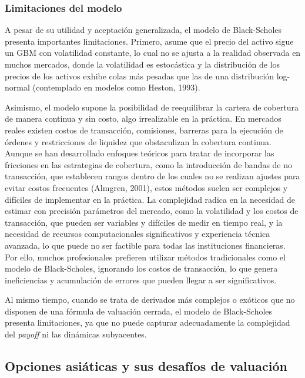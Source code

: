 \documentclass[11pt,a4paper,spanish]{article}
\numberwithin{equation}{section} %
\begin{document}
\subsubsection{Limitaciones del modelo}

A pesar de su utilidad y aceptación generalizada, el modelo de Black-Scholes presenta importantes limitaciones. Primero, asume que el precio del activo sigue un GBM con volatilidad constante, lo cual no se ajusta a la realidad observada en muchos mercados, donde la volatilidad es estocástica y la distribución de los precios de los activos exhibe colas más pesadas que las de una distribución log-normal (contemplado en modelos como Heston, 1993).

Asimismo, el modelo supone la posibilidad de reequilibrar la cartera de cobertura de manera continua y sin costo, algo irrealizable en la práctica. En mercados reales existen costos de transacción, comisiones, barreras para la ejecución de órdenes y restricciones de liquidez que obstaculizan la cobertura continua. Aunque se han desarrollado enfoques teóricos para tratar de incorporar las fricciones en las estrategias de cobertura, como la introducción de bandas de no transacción, que establecen rangos dentro de los cuales no se realizan ajustes para evitar costos frecuentes (Almgren, 2001), estos métodos suelen ser complejos y difíciles de implementar en la práctica. La complejidad radica en la necesidad de estimar con precisión parámetros del mercado, como la volatilidad y los costos de transacción, que pueden ser variables y difíciles de medir en tiempo real, y la necesidad de recursos computacionales significativos y experiencia técnica avanzada, lo que puede no ser factible para todas las instituciones financieras. Por ello, muchos profesionales prefieren utilizar métodos tradicionales como el modelo de Black-Scholes, ignorando los costos de transacción, lo que genera ineficiencias y acumulación de errores que pueden llegar a ser significativos.

Al mismo tiempo, cuando se trata de derivados más complejos o exóticos que no disponen de una fórmula de valuación cerrada, el modelo de Black-Scholes presenta limitaciones, ya que no puede capturar adecuadamente la complejidad del \textit{payoff} ni las dinámicas subyacentes. 

\subsection{Opciones asiáticas y sus desafíos de valuación}
\end{document}
